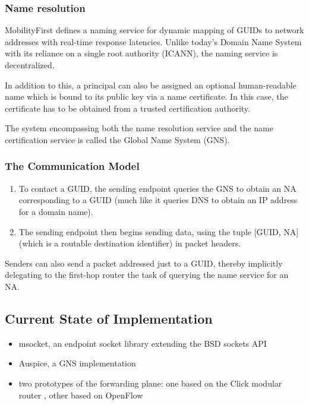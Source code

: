             \subsubsection{Name resolution}

                MobilityFirst defines a naming service for dynamic mapping of GUIDs to network addresses with real-time response latencies. Unlike today's Domain Name System with its reliance on a single root authority (ICANN), the naming service is decentralized.

                In addition to this, a principal can also be assigned an optional human-readable name which is bound to its public key via a name certificate. In this case, the certificate has to be obtained from a trusted certification authority.

                The system encompassing both the name resolution service and the name certification service is called the Global Name System (GNS).

            \subsubsection{The Communication Model}

                \begin{enumerate}
                    \item To contact a GUID, the sending endpoint queries the GNS to obtain an NA corresponding to a GUID (much like it queries DNS to obtain an IP address for a domain name).
                    \item The sending endpoint then begins sending data, using the tuple [GUID, NA] (which is a routable destination identifier) in packet headers.
                \end{enumerate}

                Senders can also send a packet addressed just to a GUID, thereby implicitly delegating to the first-hop router the task of querying the name service for an NA.

        \subsection{Current State of Implementation}

            \begin{itemize}
                \item msocket, an endpoint socket library extending the BSD sockets API
                \item Auspice, a GNS implementation
                \item two prototypes of the forwarding plane: one based on the Click modular router \cite{click}, other based on OpenFlow \cite{openflow}
            \end{itemize}

